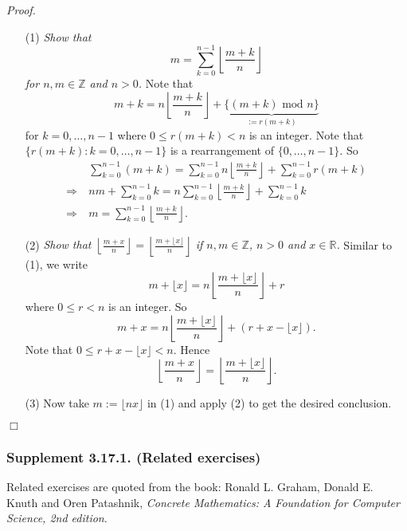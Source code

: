 \documentclass{article}
\begin{document}
\emph{Proof.}
\begin{enumerate}
\item[(1)]
  \emph{Show that
  \[
    m = \sum_{k=0}^{n-1} \left\lfloor \frac{m + k}{n} \right\rfloor
  \]
  for $n, m \in \mathbb{Z}$ and $n > 0$.}
  Note that
  \[
    m + k
    = n \left\lfloor \frac{m + k}{n} \right\rfloor
        + \underbrace{\{ (m + k) \text{ mod } n \}}_{:= r(m+k)}
  \]
  for $k = 0, \ldots, n-1$ where $0 \leq r(m+k) < n$ is an integer.
  Note that $\{ r(m+k) : k = 0, \ldots, n-1 \}$ is a rearrangement of $\{ 0, \ldots, n-1 \}$.
  So
  \begin{align*}
    &\: \sum_{k=0}^{n-1} (m+k)
    = \sum_{k=0}^{n-1} n \left\lfloor \frac{m + k}{n} \right\rfloor + \sum_{k=0}^{n-1} r(m+k) \\
    \Longrightarrow &\:
    nm + \sum_{k=0}^{n-1} k
    = n \sum_{k=0}^{n-1} \left\lfloor \frac{m + k}{n} \right\rfloor + \sum_{k=0}^{n-1} k \\
    \Longrightarrow &\:
    m = \sum_{k=0}^{n-1} \left\lfloor \frac{m + k}{n} \right\rfloor.
  \end{align*}

\item[(2)]
  \emph{Show that $\left\lfloor \frac{m + x}{n} \right\rfloor
  = \left\lfloor \frac{m + \lfloor x \rfloor}{n} \right\rfloor$
  if $n, m \in \mathbb{Z}$, $n > 0$ and $x \in \mathbb{R}$.}
  Similar to (1), we write
  \[
    m + \lfloor x \rfloor
    = n \left\lfloor \frac{m + \lfloor x \rfloor}{n} \right\rfloor + r
  \]
  where $0 \leq r < n$ is an integer.
  So
  \[
    m + x
    = n \left\lfloor \frac{m + \lfloor x \rfloor}{n} \right\rfloor
    + (r + x - \lfloor x \rfloor).
  \]
  Note that $0 \leq r + x - \lfloor x \rfloor < n$.
  Hence
  \[
    \left\lfloor \frac{m + x}{n} \right\rfloor
    = \left\lfloor \frac{m + \lfloor x \rfloor}{n} \right\rfloor.
  \]

\item[(3)]
  Now take $m := \lfloor nx \rfloor$ in (1) and apply (2) to get the desired conclusion.
\end{enumerate}
$\Box$ \\






\subsubsection*{Supplement 3.17.1. (Related exercises)}
Related exercises are quoted from the book:
Ronald L. Graham, Donald E. Knuth and Oren Patashnik,
\emph{Concrete Mathematics: A Foundation for Computer Science, 2nd edition}.
\end{document}
